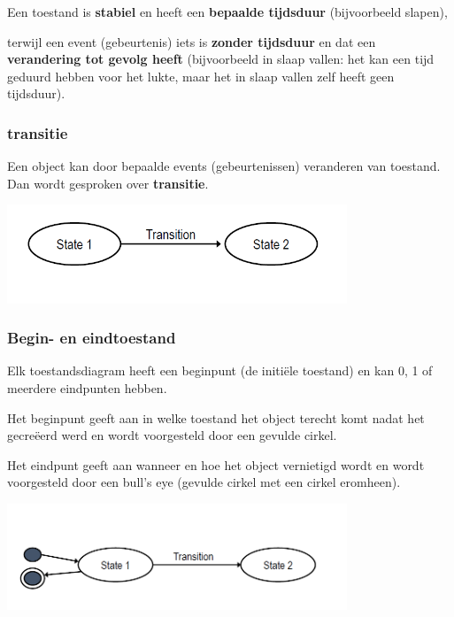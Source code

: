 Een toestand is \textbf{stabiel} en heeft een \textbf{bepaalde tijdsduur} (bijvoorbeeld slapen), 

terwijl een event (gebeurtenis) iets is \textbf{zonder tijdsduur} en dat een \textbf{verandering tot gevolg heeft} (bijvoorbeeld in slaap vallen: het kan een tijd geduurd hebben voor het lukte, maar het in slaap vallen zelf heeft geen tijdsduur).

\subsubsection{transitie}

Een object kan door bepaalde events (gebeurtenissen) veranderen van toestand. Dan wordt gesproken over \textbf{transitie}.


\begin{center}
\includegraphics[width=4in]{img/state1}%
\end{center}
\newpage

\subsubsection{Begin- en eindtoestand}

Elk toestandsdiagram heeft een beginpunt (de initiële toestand) en kan 0, 1 of meerdere eindpunten hebben.

Het beginpunt geeft aan in welke toestand het object terecht komt nadat het gecreëerd werd en wordt voorgesteld door een gevulde cirkel.

Het eindpunt geeft aan wanneer en hoe het object vernietigd wordt en wordt voorgesteld door een bull's eye (gevulde cirkel met een cirkel eromheen).


\begin{center}
\includegraphics[width=4in]{img/state3}%
\end{center}

